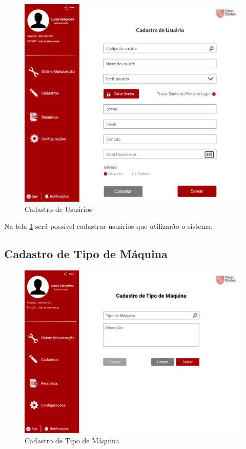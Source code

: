 \begin{figure}[htb]
	\caption{\label{web_cad-user}Cadastro de Usuários}
	\begin{center}
		\includegraphics[scale=0.70]{./Figuras/web/cad-user.png}
	\end{center}
\end{figure}

Na tela \ref{web_cad-user} será possível cadastrar usuários que utilizarão o sistema.

\newpage
\subsection{Cadastro de Tipo de Máquina}

\begin{figure}[htb]
	\caption{\label{web_cad-tipo-maquina}Cadastro de Tipo de Máquina}
	\begin{center}
		\includegraphics[scale=0.55]{./Figuras/web/cad-tipo-maquina.png}
	\end{center}
\end{figure}

